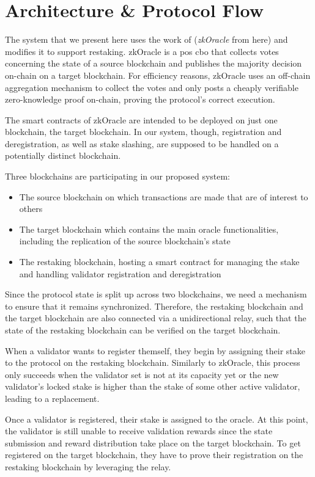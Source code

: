 \documentclass{article}
\begin{document}
	\section{Architecture \& Protocol Flow}
	\label{sec:architecture}
	
	The system that we present here uses the work of \cite{zkoracle} (\emph{zkOracle} from here) and modifies it to support restaking.
	zkOracle is a \gls{pos} \gls{cbo} that collects votes concerning the state of a source blockchain and publishes the majority decision on-chain on a target blockchain.
	For efficiency reasons, zkOracle uses an off-chain aggregation mechanism to collect the votes and only posts a cheaply verifiable zero-knowledge proof on-chain, proving the protocol's correct execution.
	
	The smart contracts of zkOracle are intended to be deployed on just one blockchain, the target blockchain.
	In our system, though, registration and deregistration, as well as stake slashing, are supposed to be handled on a potentially distinct blockchain.
	
	Three blockchains are participating in our proposed system:
	\begin{itemize}
		\item The source blockchain on which transactions are made that are of interest to others
		\item The target blockchain which contains the main oracle functionalities, including the replication of the source blockchain's state
		\item The restaking blockchain, hosting a smart contract for managing the stake and handling validator registration and deregistration
	\end{itemize}
	
	Since the protocol state is split up across two blockchains, we need a mechanism to ensure that it remains synchronized.
	Therefore, the restaking blockchain and the target blockchain are also connected via a unidirectional relay, such that the state of the restaking blockchain can be verified on the target blockchain.
	
	When a validator wants to register themself, they begin by assigning their stake to the protocol on the restaking blockchain.
	Similarly to zkOracle, this process only succeeds when the validator set is not at its capacity yet or the new validator's locked stake is higher than the stake of some other active validator, leading to a replacement.
	
	Once a validator is registered, their stake is assigned to the oracle.
	At this point, the validator is still unable to receive validation rewards since the state submission and reward distribution take place on the target blockchain.
	To get registered on the target blockchain, they have to prove their registration on the restaking blockchain by leveraging the relay.
	
\end{document}
